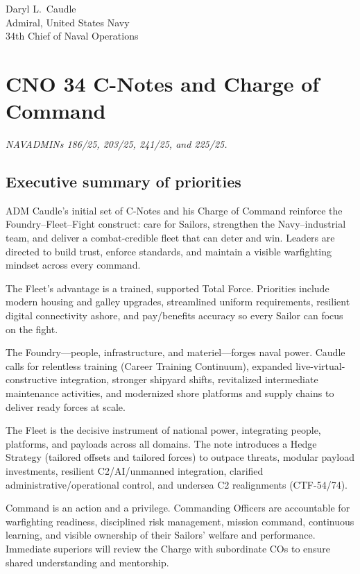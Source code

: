 \documentclass[../main.tex]{subfiles}
\begin{document}
\begin{description}[style=nextline, labelsep=0.5em, font=\bfseries]
    \medskip
    Daryl L.\ Caudle\\
    Admiral, United States Navy\\
    34th Chief of Naval Operations
\end{description}

\section{CNO 34 C-Notes and Charge of Command}\label{app:cno34-cnotes}
\emph{\footnotesize NAVADMINs 186/25, 203/25, 241/25, and 225/25.~\autocite{cno-cnote-1-2025,cno-cnote-2-2025,cno-cnote-3-2025,cno-charge-of-command-2025}}

\subsection{Executive summary of priorities}
\begin{description}[style=nextline, labelsep=0.5em, font=\bfseries]
  \item[Overview.] ADM Caudle's initial set of C-Notes and his Charge of Command reinforce the Foundry--Fleet--Fight construct: care for Sailors, strengthen the Navy--industrial team, and deliver a combat-credible fleet that can deter and win. Leaders are directed to build trust, enforce standards, and maintain a visible warfighting mindset across every command.
  \item[C-Note \#1: Sailors First.] The Fleet's advantage is a trained, supported Total Force. Priorities include modern housing and galley upgrades, streamlined uniform requirements, resilient digital connectivity ashore, and pay/benefits accuracy so every Sailor can focus on the fight.\autocite{cno-cnote-1-2025}
  \item[C-Note \#2: Foundry Always.] The Foundry---people, infrastructure, and materiel---forges naval power. Caudle calls for relentless training (Career Training Continuum), expanded live-virtual-constructive integration, stronger shipyard shifts, revitalized intermediate maintenance activities, and modernized shore platforms and supply chains to deliver ready forces at scale.\autocite{cno-cnote-2-2025}
  \item[C-Note \#3: World Class Fleet.] The Fleet is the decisive instrument of national power, integrating people, platforms, and payloads across all domains. The note introduces a Hedge Strategy (tailored offsets and tailored forces) to outpace threats, modular payload investments, resilient C2/AI/unmanned integration, clarified administrative/operational control, and undersea C2 realignments (CTF-54/74).\autocite{cno-cnote-3-2025}
  \item[Charge of Command.] Command is an action and a privilege. Commanding Officers are accountable for warfighting readiness, disciplined risk management, mission command, continuous learning, and visible ownership of their Sailors' welfare and performance. Immediate superiors will review the Charge with subordinate COs to ensure shared understanding and mentorship.\autocite{cno-charge-of-command-2025}
\end{description}
\end{document}

